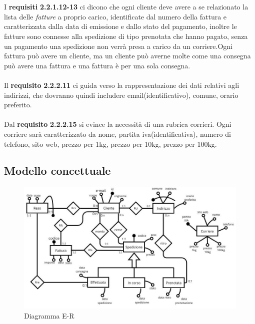 \documentclass[a4paper,12pt]{article}
\begin{document}
\\\\
I \textbf{requisiti} \textbf{2.2.1.12-13} ci dicono che ogni cliente deve avere a se relazionato la lista delle \textit{fatture} a proprio carico, identificate dal numero della fattura e caratterizzata dalla data di emissione e dallo stato del pagamento, inoltre le fatture sono connesse alla spedizione di tipo prenotata che hanno pagato, senza un pagamento una spedizione non verrà presa a carico da un corriere.Ogni fattura può avere un cliente, ma un cliente può averne molte come una consegna può avere una fattura e una fattura è per una sola consegna.
\\\\
Il \textbf{requisito} \textbf{2.2.2.11} ci guida verso la rappresentazione dei dati relativi agli indirizzi, che dovranno quindi includere 
email(identificativo), comune, orario preferito. \\ \\
Dal \textbf{requisito} \textbf{2.2.2.15} si evince la necessità di una rubrica corrieri. Ogni corriere sarà caratterizzato da nome, 
partita iva(identificativa), numero di telefono, sito web, prezzo per 1kg, prezzo per 10kg, prezzo per 100kg.

\subsection{Modello concettuale}
\begin{figure}[H]
  \centering
  \includegraphics[width=\textwidth]{assets/ER_diagram.jpg}
  \caption{Diagramma E-R}
\end{figure}
\end{document}
